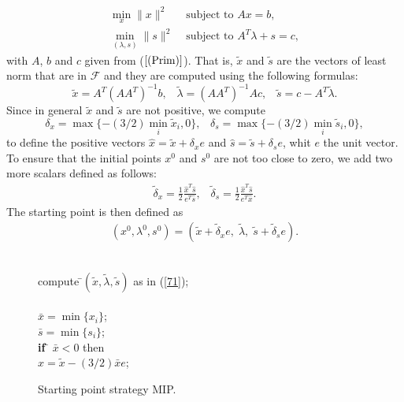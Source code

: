 \documentclass[a4paper,10 pt,titlepage,twoside]{report}
\theoremstyle{plain}
\theoremstyle{definition}
\theoremstyle{remark}
\begin{document}
{{\begin{align*}
\min\limits_{x} \lVert x \rVert ^{2} &\text{ subject to }Ax = b,\\
\min\limits_{(\lambda,s)} \lVert s \rVert ^{2} &\text{ subject to } A^{T}\lambda +s = c,
\end{align*}
with $A$, $b$ and $c$ given from ($\ref{(Prim)}$). That is, $\tilde{x}$ and $\tilde{s}$ are the vectors of least norm that are in $\mathcal{F}$ and they are computed using the following formulas:
\begin{equation}\label{71}
\tilde{x} = A^{T}(AA^{T})^{-1}b,\;\;\;\tilde{\lambda}=(AA^{T})^{-1}Ac,\;\;\; \tilde{s} = c- A^{T}\tilde{\lambda}.
\end{equation}
Since in general $\tilde{x}$ and $\tilde{s}$ are not positive, we compute
\begin{equation*}
\delta_{x} = \max\{-(3/2)\min\limits_{i}\tilde{x}_{i},0\},\;\;\; \delta_{s} = \max\{-(3/2)\min\limits_{i}\tilde{s}_{i},0\},
\end{equation*}
to define the positive vectors $\hat{x}= \tilde{x}+\delta_{x}e$ and $\hat{s}= \tilde{s}+\delta_{s}e$, whit $e$ the unit vector. To ensure that the initial points $x^{0}$ and $s^{0}$ are not too close to zero, we add two more scalars defined as follows:
\begin{align}\label{72}
\tilde{\delta}_{x}= \frac{1}{2}\frac{\hat{x}^{T}\hat{s}}{e^{T}\hat{s}},\;\;\;\tilde{\delta}_{s} =\frac{1}{2}\frac{\hat{x}^{T}\hat{s}}{e^{T}\hat{x}}.
\end{align}
The starting point is then defined as 
\begin{align*}
(x^{0}, \lambda^{0}, s^{0}) = (\tilde{x}+\tilde{\delta}_{x} e,\;\tilde{\lambda},\;\tilde{s}+\tilde{\delta}_{s} e).
\end{align*}
\\
\begin{figure}\caption{\label{fig:MIP}Starting point strategy MIP.}
	\centering
	{\noindent\begin{boxedminipage}{1\linewidth}
			\begin{tabbing}
			compute \=$(\tilde{x},\tilde{\lambda},\tilde{s})$ as in (\ref{71});\\				
			\=\\
				\>$\bar{x} = \min\{x_{i}\}$;\\
				\>$\bar{s} = \min\{s_{i}\}$;\\
				\textbf{if} \= $\bar{x}<0$ then\\
				\> $\hat{x}= \tilde{x} -(3/2)\bar{x}e$;\\

\end{tabbing}
\end{boxedminipage}}
\end{figure}}}
\end{document}

